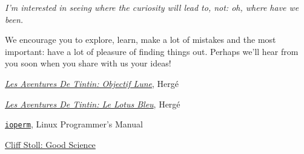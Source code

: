 \documentclass[12pt]{report}
\begin{document}
\textit{I'm interested in seeing where the curiosity will lead to, not: oh, where have we been.}

We encourage you to explore, learn, make a lot of mistakes and the most important: have a lot of pleasure of finding things out. Perhaps we'll hear from you soon when you share with us your ideas!

\newpage

\begin{thebibliography}{50}

 \hyperlink{https://fr.wikipedia.org/wiki/Objectif_Lune}{\textit{Les Aventures De Tintin: Objectif Lune}}, Hergé

 \hyperlink{https://fr.wikipedia.org/wiki/Le_Lotus_bleu}{\textit{Les Aventures De Tintin: Le Lotus Bleu}}, Hergé

 \hyperlink{http://man7.org/linux/man-pages/man2/ioperm.2.html}{\texttt{ioperm}}, Linux Programmer's Manual

 \hyperlink{https://www.youtube.com/watch?v=xHEIOgONq6A}{Cliff Stoll: Good Science}

\end{thebibliography}
\end{document}
